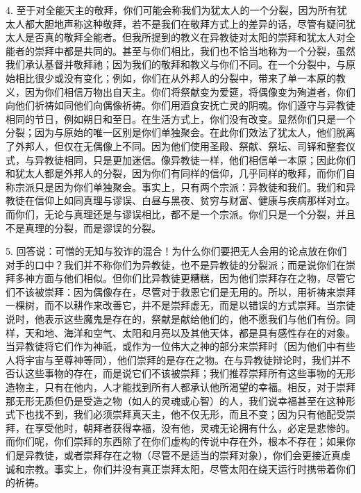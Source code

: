 4. 至于对全能天主的敬拜，你们可能会称我们为犹太人的一个分裂，因为所有犹太人都大胆地声称这种敬拜，若不是我们在敬拜方式上的差异的话，尽管有疑问犹太人是否真的敬拜全能者。但我所提到的教义在异教徒对太阳的崇拜和犹太人对全能者的崇拜中都是共同的。甚至与你们相比，我们也不恰当地称为一个分裂，虽然我们承认基督并敬拜祂；因为我们的敬拜和教义与你们不同。在一个分裂中，与原始相比很少或没有变化；例如，你们在从外邦人的分裂中，带来了单一本原的教义，因为你们相信万物出自天主。你们将祭献变为爱筵，将偶像变为殉道者，你们向他们祈祷如同他们向偶像祈祷。你们用酒食安抚亡灵的阴魂。你们遵守与异教徒相同的节日，例如朔日和至日。在生活方式上，你们没有改变。显然你们只是一个分裂；因为与原始的唯一区别是你们单独聚会。在此你们效法了犹太人，他们脱离了外邦人，但仅在无偶像上不同。因为他们使用圣殿、祭献、祭坛、司铎和整套仪式，与异教徒相同，只是更加迷信。像异教徒一样，他们相信单一本原；因此你们和犹太人都是外邦人的分裂，因为你们有同样的信仰，几乎同样的敬拜，而你们自称宗派只是因为你们单独聚会。事实上，只有两个宗派：异教徒和我们。我们和异教徒在信仰上如同真理与谬误、白昼与黑夜、贫穷与财富、健康与疾病那样对立。而你们，无论与真理还是与谬误相比，都不是一个宗派。你们只是一个分裂，并且不是真理的分裂，而是谬误的分裂。\par

5. 回答说：可憎的无知与狡诈的混合！为什么你们要把无人会用的论点放在你们对手的口中？我们并不称你们为异教徒，也不是异教徒的分裂派；而是说你们在崇拜多神方面与他们相似。但你们比异教徒更糟糕，因为他们崇拜存在之物，尽管它们不该被崇拜：因为偶像存在，尽管对于救恩它们是无用的。所以，用祈祷来崇拜一棵树，而不以耕作来改善它，并不是崇拜虚无，而是以错误的方式崇拜。当宗徒说时，他表示这些魔鬼是存在的，祭献是献给他们的，他不愿我们与他们有份。同样，天和地、海洋和空气、太阳和月亮以及其他天体，都是具有感性存在的对象。当异教徒将它们作为神祇，或作为一位伟大之神的部分来崇拜时（因为他们中有些人将宇宙与至尊神等同），他们崇拜的是存在之物。在与异教徒辩论时，我们并不否认这些事物的存在，而是说它们不该被崇拜；我们推荐崇拜所有这些事物的无形造物主，只有在他内，人才能找到所有人都承认他所渴望的幸福。相反，对于崇拜那无形无质但仍是受造之物（如人的灵魂或心智）的人，我们说幸福甚至在这种形式下也找不到，我们必须崇拜真天主，他不仅无形，而且不变；因为只有他配受崇拜，在享受他时，朝拜者获得幸福，没有他，灵魂无论拥有什么，必定是悲惨的。而你们呢，你们崇拜的东西除了在你们虚构的传说中存在外，根本不存在；如果你们是异教徒，或者崇拜存在之物（尽管不是适当的崇拜对象），你们会更接近真虔诚和宗教。事实上，你们并没有真正崇拜太阳，尽管太阳在绕天运行时携带着你们的祈祷。\par

